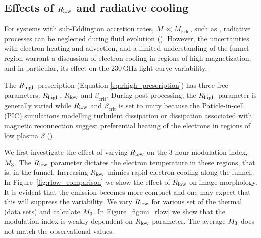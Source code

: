 \subsection{Effects of \texorpdfstring{$R_\mathrm{low}$}{Rl} and radiative cooling}

For systems with sub-Eddington accretion rates, $\Dot{M}\ll\Dot{M}_\mathrm{Edd}$, such as \sgra, radiative processes can be neglected during fluid evolution (\citealt{2012MNRAS.426.1928D, 10.1093/mnras/stw3116, Ryan_2017}).
However, the uncertainties with electron heating and advection, and a limited understanding of the funnel region warrant a discussion of electron cooling in regions of high magnetization, and in particular, its effect on the 230\,GHz light curve variability.

The $R_\mathrm{high}$ prescription (Equation \ref{eq:rhigh_prescription}) has three free parameters: $R_\mathrm{high}$, $R_\mathrm{low}$ and $\beta_\mathrm{crit}$. During post-processing, the $R_\mathrm{high}$ parameter is generally varied while $R_\mathrm{low}$ and $\beta_\mathrm{crit}$ is set to unity because the Paticle-in-cell (PIC) simulations modelling turbulent dissipation or dissipation associated with magnetic reconnection suggest preferential heating of the electrons in regions of low plasma $\beta$ (\citealt{2010MNRAS.409L.104H, Rowan_2017, 10.1093/mnras/stx2530, Rowan_2019, Kawazura771, PhysRevX.10.041050, kawazura2021energy}).

We first investigate the effect of varying $R_\mathrm{low}$ on the 3 hour modulation index, $M_{3}$. The $R_\mathrm{low}$ parameter dictates the electron temperature in these regions, that is, in the funnel. Increasing $R_\mathrm{low}$ mimics rapid electron cooling along the funnel.
In Figure~\ref{fig:rlow_comparison} we show the effect of $R_\mathrm{low}$ on image morphology. It is evident that the emission becomes more compact and one may expect that this will suppress the variability.
We vary $R_\mathrm{low}$ for various set of the thermal (\kharma data sets) and calculate $M_{3}$. In Figure~\ref{fig:mi_rlow} we show that the modulation index is weakly dependent on $R_\mathrm{low}$ parameter.
The average $M_{3}$ does not match the observational values.


